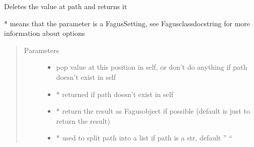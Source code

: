 \documentclass[a4paper,10pt,english]{sphinxmanual}
\begin{document}
\begin{fulllineitems}
\begin{fulllineitems}
\begin{quote}
\begin{description}
\end{description}\end{quote}

\end{fulllineitems}


\begin{fulllineitems}
\label{\detokenize{fagus.fagus:fagus.fagus.Fagus.pop}}
\pysigstartsignatures
{}
\pysigstopsignatures
\sphinxAtStartPar
Deletes the value at path and returns it

\sphinxAtStartPar
* means that the parameter is a Fagus\sphinxhyphen{}Setting, see Fagus\sphinxhyphen{}class\sphinxhyphen{}docstring for more information about options
\begin{quote}\begin{description}
\item[{Parameters}] \leavevmode\begin{itemize}
\item {}
\sphinxAtStartPar
{} \textendash{} pop value at this position in self, or don’t do anything if path doesn’t exist in self

\item {}
\sphinxAtStartPar
{} \textendash{} * returned if path doesn’t exist in self

\item {}
\sphinxAtStartPar
{} \textendash{} * return the result as Fagus\sphinxhyphen{}object if possible (default is just to return the result)

\item {}
\sphinxAtStartPar
{} \textendash{} * used to split path into a list if path is a str, default ” “


\end{itemize}
\end{description}
\end{quote}
\end{fulllineitems}
\end{fulllineitems}
\end{document}
